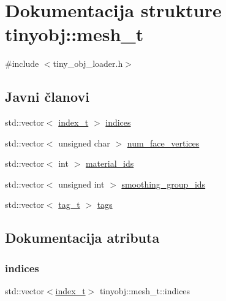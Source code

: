 \hypertarget{structtinyobj_1_1mesh__t}{}\section{Dokumentacija strukture tinyobj\+:\+:mesh\+\_\+t}
\label{structtinyobj_1_1mesh__t}


{\ttfamily \#include $<$tiny\+\_\+obj\+\_\+loader.\+h$>$}

\subsection*{Javni članovi}
\begin{DoxyCompactItemize}
\item 
std\+::vector$<$ \hyperlink{structtinyobj_1_1index__t}{index\+\_\+t} $>$ \hyperlink{structtinyobj_1_1mesh__t_a9dcdbdf04eca02a552793ac7d160127c}{indices}
\item 
std\+::vector$<$ unsigned char $>$ \hyperlink{structtinyobj_1_1mesh__t_ae5f29bef4c1de10253020f9f7ab7374e}{num\+\_\+face\+\_\+vertices}
\item 
std\+::vector$<$ int $>$ \hyperlink{structtinyobj_1_1mesh__t_a57b2f12dfa3fd620b25babcd3a09ec6b}{material\+\_\+ids}
\item 
std\+::vector$<$ unsigned int $>$ \hyperlink{structtinyobj_1_1mesh__t_a89b017a3446709c264d94438a9d7541b}{smoothing\+\_\+group\+\_\+ids}
\item 
std\+::vector$<$ \hyperlink{structtinyobj_1_1tag__t}{tag\+\_\+t} $>$ \hyperlink{structtinyobj_1_1mesh__t_a60f51d3802c11e2bf269530e0337fc63}{tags}
\end{DoxyCompactItemize}


\subsection{Dokumentacija atributa}
\mbox{\label{structtinyobj_1_1mesh__t_a9dcdbdf04eca02a552793ac7d160127c}} 
\subsubsection{\texorpdfstring{indices}{indices}}
{\footnotesize\ttfamily std\+::vector$<$\hyperlink{structtinyobj_1_1index__t}{index\+\_\+t}$>$ tinyobj\+::mesh\+\_\+t\+::indices}

